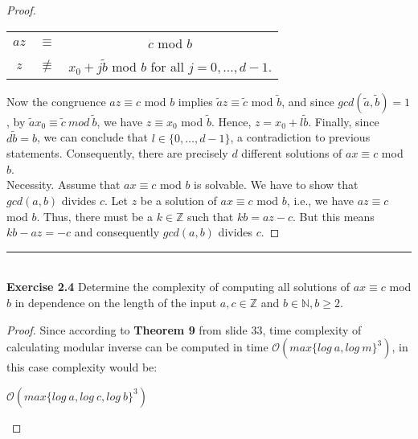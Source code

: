 \documentclass[a4paper]{article}
\begin{document}
\begin{proof}
\begin{center}
\begin{tabular}{c c c}
$az$ & $\equiv$ & $c$ mod $b$ \\
$z$ & $\not \equiv$ & $x_{0} + j\tilde{b}$ mod $b$ for all $j = 0, \ldots, d-1$.
\end{tabular}
\end{center}
Now the congruence $az \equiv c$ mod $b$ implies $\tilde{a}z \equiv \tilde{c}$ mod $\tilde{b}$, and since $gcd(\tilde{a}, \tilde{b}) = 1$, by $\tilde{a}x_{0} \equiv \tilde{c}\ mod\ \tilde{b}$, we have $z \equiv x_{0}$ mod $\tilde{b}$. Hence, $z = x_{0} + l \tilde{b}$. Finally, since $d \tilde{b} = b$, we can conclude that $l \in \{0, \ldots, d - 1 \}$, a contradiction to previous statements. Consequently, there are precisely $d$ different solutions of $ax \equiv c$ mod $b$.\\
Necessity. Assume that $ax \equiv c$ mod $b$ is solvable. We have to show that $gcd(a, b)$ divides $c$. Let $z$ be a solution of $ax \equiv c$ mod $b$, i.e., we have $az \equiv c$ mod $b$. Thus, there must be a $k \in \mathbb{Z}$ such that $kb = az - c$. But this means $kb - az = -c$ and consequently $gcd(a,b)$ divides $c$.
\end{proof}



\noindent\rule{12cm}{0.4pt}\\
\noindent \textbf{Exercise 2.4} Determine the complexity of computing all solutions of $ax \equiv c$ mod $b$ in dependence on the length of the input $a, c \in \mathbb{Z}$ and $b \in \mathbb{N}, b \geq 2$.
\begin{proof}
Since according to \textbf{Theorem 9} from slide 33, time complexity of calculating modular inverse can be computed in time $\mathcal{O}(max\{log\ a, log\ m\}^3)$, in this case complexity would be:
\begin{center}
$\mathcal{O}(max\{log\ a, log\ c, log\ b\}^3)$
\end{center}
\end{proof}
\end{document}
